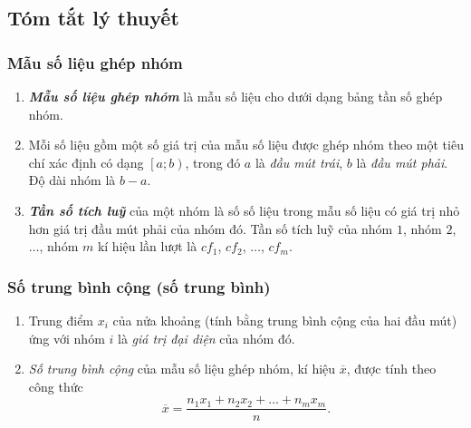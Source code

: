 \setcounter{chapter}{2}
\setcounter{subsubsection}{0}
\setcounter{ex}{0}
\setcounter{bt}{0}

\subsection{Tóm tắt lý thuyết}
\begin{tomtat}
	\subsubsection{Mẫu số liệu ghép nhóm}
		\begin{enumerate}
			\item \textbf{\textit{Mẫu số liệu ghép nhóm}} là mẫu số liệu cho dưới dạng bảng tần số ghép nhóm.
			\item Mỗi số liệu gồm một số giá trị của mẫu số liệu được ghép nhóm theo một tiêu chí xác định có dạng $\left[a;b\right)$, trong đó $a$ là \textit{đầu mút trái}, $b$ là \textit{đầu mút phải}. Độ dài nhóm là $b-a$.
			\item \textbf{\textit{Tần số tích luỹ}} của một nhóm là số số liệu trong mẫu số liệu có giá trị nhỏ hơn giá trị đầu mút phải của nhóm đó. Tần số tích luỹ của nhóm $1$, nhóm $2$, $\ldots$, nhóm $m$ kí hiệu lần lượt là $cf_1$, $cf_2$, $\ldots$, $cf_m$.
		\end{enumerate}
	\subsubsection{Số trung bình cộng (số trung bình)}
		\begin{enumerate}
			\item Trung điểm $x_i$ của nửa khoảng (tính bằng trung bình cộng của hai đầu mút) ứng với nhóm $i$ là \textit{giá trị đại diện} của nhóm đó.
			\item \textit{Số trung bình cộng} của mẫu số liệu ghép nhóm, kí hiệu $\overline{x}$, được tính theo công thức 
				$$\overline{x} = \dfrac{n_1x_1 + n_2x_2 + \ldots + n_mx_m}{n}.$$
		\end{enumerate}

\end{tomtat}
